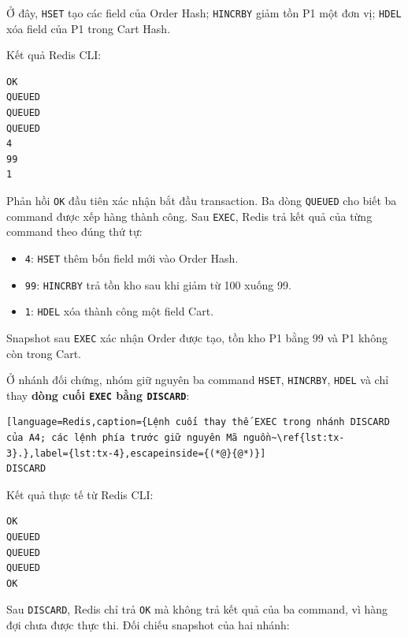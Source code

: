 Ở đây, \texttt{HSET} tạo các field của Order Hash; \texttt{HINCRBY} giảm tồn P1 một đơn vị; \texttt{HDEL} xóa field của P1 trong Cart Hash.

Kết quả Redis CLI:

\reportblockspace{72pt}
\begingroup
{}\label{result:tx-2}
\nopagebreak[4]
\begin{Verbatim}
OK
QUEUED
QUEUED
QUEUED
4
99
1
\end{Verbatim}
\endgroup\par\smallskip
Phản hồi \texttt{OK} đầu tiên xác nhận bắt đầu transaction. Ba dòng \texttt{QUEUED} cho biết ba command được xếp hàng thành công. Sau \texttt{EXEC}, Redis trả kết quả của từng command theo đúng thứ tự:

\begin{itemize}[leftmargin=*,itemsep=2pt,topsep=4pt]
\item
\texttt{4}: \texttt{HSET} thêm bốn field mới vào Order Hash.

\item
\texttt{99}: \texttt{HINCRBY} trả tồn kho sau khi giảm từ 100 xuống 99.

\item
\texttt{1}: \texttt{HDEL} xóa thành công một field Cart.

\end{itemize}
Snapshot sau \texttt{EXEC} xác nhận Order được tạo, tồn kho P1 bằng 99 và P1 không còn trong Cart.

Ở nhánh đối chứng, nhóm giữ nguyên ba command \texttt{HSET}, \texttt{HINCRBY}, \texttt{HDEL} và chỉ thay \textbf{dòng cuối \texttt{EXEC} bằng \texttt{DISCARD}}:

\reportblockspace{72pt}
\begin{lstlisting}[language=Redis,caption={Lệnh cuối thay thế EXEC trong nhánh DISCARD của A4; các lệnh phía trước giữ nguyên Mã nguồn~\ref{lst:tx-3}.},label={lst:tx-4},escapeinside={(*@}{@*)}]
DISCARD
\end{lstlisting}

Kết quả thực tế từ Redis CLI:

\reportblockspace{72pt}
\begingroup
{}\label{result:tx-3}
\nopagebreak[4]
\begin{Verbatim}
OK
QUEUED
QUEUED
QUEUED
OK
\end{Verbatim}
\endgroup\par\smallskip
Sau \texttt{DISCARD}, Redis chỉ trả \texttt{OK} mà không trả kết quả của ba command, vì hàng đợi chưa được thực thi. Đối chiếu snapshot của hai nhánh:

